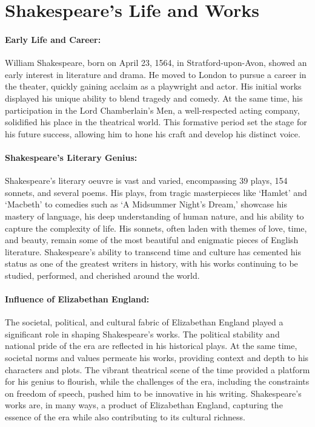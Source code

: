 \documentclass{book}
\begin{document}
\section*{Shakespeare’s Life and Works}

\paragraph{Early Life and Career:}
William Shakespeare, born on April 23, 1564, in Stratford-upon-Avon, showed an early interest in literature and drama. He moved to London to pursue a career in the theater, quickly gaining acclaim as a playwright and actor. His initial works displayed his unique ability to blend tragedy and comedy. At the same time, his participation in the Lord Chamberlain's Men, a well-respected acting company, solidified his place in the theatrical world. This formative period set the stage for his future success, allowing him to hone his craft and develop his distinct voice.

\paragraph{Shakespeare’s Literary Genius:}
Shakespeare’s literary oeuvre is vast and varied, encompassing 39 plays, 154 sonnets, and several poems. His plays, from tragic masterpieces like ‘Hamlet’ and ‘Macbeth’ to comedies such as ‘A Midsummer Night’s Dream,’ showcase his mastery of language, his deep understanding of human nature, and his ability to capture the complexity of life. His sonnets, often laden with themes of love, time, and beauty, remain some of the most beautiful and enigmatic pieces of English literature. Shakespeare’s ability to transcend time and culture has cemented his status as one of the greatest writers in history, with his works continuing to be studied, performed, and cherished around the world.

\paragraph{Influence of Elizabethan England:}
The societal, political, and cultural fabric of Elizabethan England played a significant role in shaping Shakespeare’s works. The political stability and national pride of the era are reflected in his historical plays. At the same time, societal norms and values permeate his works, providing context and depth to his characters and plots. The vibrant theatrical scene of the time provided a platform for his genius to flourish, while the challenges of the era, including the constraints on freedom of speech, pushed him to be innovative in his writing. Shakespeare’s works are, in many ways, a product of Elizabethan England, capturing the essence of the era while also contributing to its cultural richness.
\end{document}

